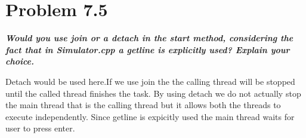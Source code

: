 \documentclass[a4paper,11pt]{article}
\theoremstyle{mytheor}
\begin{document}
\section*{Problem 7.5}

\textbf{\textit{Would you use join or a detach in the start method, considering the fact that in
Simulator.cpp a getline is explicitly used? Explain your choice.}}

Detach would be used here.If we use join the the calling thread will be stopped until the called thread finishes the task. By using detach we do not actually stop the main thread that is the calling thread but it allows both the threads to execute independently. Since getline is expicitly used the main thread waits for user to press enter. 
\\
\\


\\
\\
\end{document}
